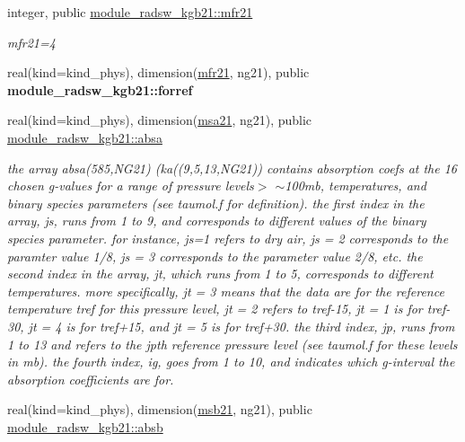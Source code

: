 \begin{DoxyCompactItemize}
integer, public \hyperlink{group__module__radsw__kgbnn_ga5575239aa9d55abcca1ac1f82dc4c4ec}{module\+\_\+radsw\+\_\+kgb21\+::mfr21}
\begin{DoxyCompactList}\small\item\em mfr21=4 \end{DoxyCompactList}\item 
\mbox{\label{group__module__radsw__kgbnn_gac93d473e0309275f03a89b161377a034}} 
real(kind=kind\+\_\+phys), dimension(\hyperlink{group__module__radsw__kgbnn_ga5575239aa9d55abcca1ac1f82dc4c4ec}{mfr21}, ng21), public {\bfseries module\+\_\+radsw\+\_\+kgb21\+::forref}
\item 
\mbox{\label{group__module__radsw__kgbnn_ga7cce83c282d3efec6a3fe319480c270a}} 
real(kind=kind\+\_\+phys), dimension(\hyperlink{namespacemodule__radsw__kgb21_a235b17e9b4b37668028c572f80e1188a}{msa21}, ng21), public \hyperlink{group__module__radsw__kgbnn_ga7cce83c282d3efec6a3fe319480c270a}{module\+\_\+radsw\+\_\+kgb21\+::absa}
\begin{DoxyCompactList}\small\item\em the array absa(585,\+N\+G21) (ka((9,5,13,\+N\+G21)) contains absorption coefs at the 16 chosen g-\/values for a range of pressure levels$>$ $\sim$100mb, temperatures, and binary species parameters (see taumol.\+f for definition). the first index in the array, js, runs from 1 to 9, and corresponds to different values of the binary species parameter. for instance, js=1 refers to dry air, js = 2 corresponds to the paramter value 1/8, js = 3 corresponds to the parameter value 2/8, etc. the second index in the array, jt, which runs from 1 to 5, corresponds to different temperatures. more specifically, jt = 3 means that the data are for the reference temperature tref for this pressure level, jt = 2 refers to tref-\/15, jt = 1 is for tref-\/30, jt = 4 is for tref+15, and jt = 5 is for tref+30. the third index, jp, runs from 1 to 13 and refers to the jpth reference pressure level (see taumol.\+f for these levels in mb). the fourth index, ig, goes from 1 to 10, and indicates which g-\/interval the absorption coefficients are for. \end{DoxyCompactList}\item 
\mbox{\label{group__module__radsw__kgbnn_ga1d3f12f050c90be49f109205c463b29b}} 
real(kind=kind\+\_\+phys), dimension(\hyperlink{group__module__radsw__kgbnn_ga59710ca5b31c30385ea968c0f01e2e81}{msb21}, ng21), public \hyperlink{group__module__radsw__kgbnn_ga1d3f12f050c90be49f109205c463b29b}{module\+\_\+radsw\+\_\+kgb21\+::absb}

\end{DoxyCompactItemize}
